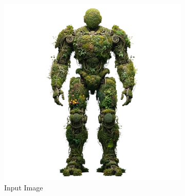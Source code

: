 \begin{figure}[H]
\begin{subfigure}[b]{0.38\textwidth}
        \includegraphics[width=\textwidth]{figures/input/plantRobot.png}
        \caption{Input Image}
    \end{subfigure}
    \begin{subfigure}[b]{0.21\textwidth}
        \centering

\end{subfigure}
\end{figure}
